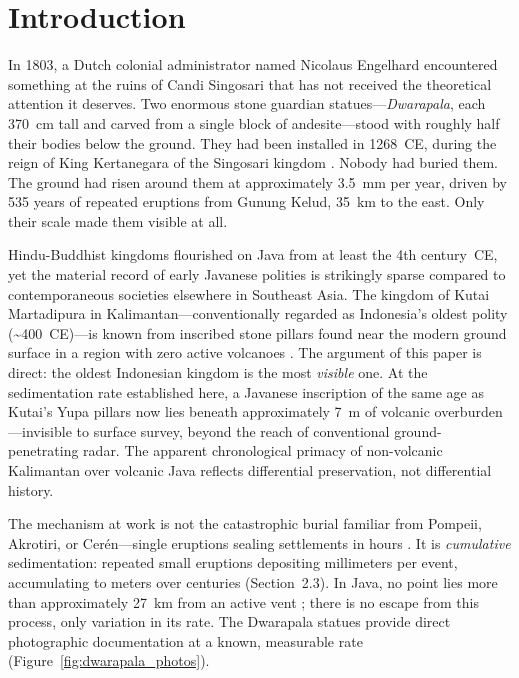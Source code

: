 \documentclass[12pt,a4paper]{article}
\begin{document}
\section{Introduction}

In 1803, a Dutch colonial administrator named Nicolaus Engelhard encountered something at the ruins of Candi Singosari that has not received the theoretical attention it deserves. Two enormous stone guardian statues---\textit{Dwarapala}, each 370~cm tall and carved from a single block of andesite---stood with roughly half their bodies below the ground. They had been installed in 1268~CE, during the reign of King Kertanegara of the Singosari kingdom \citep{kinney2003}. Nobody had buried them. The ground had risen around them at approximately 3.5~mm per year, driven by 535 years of repeated eruptions from Gunung Kelud, 35~km to the east. Only their scale made them visible at all.

Hindu-Buddhist kingdoms flourished on Java from at least the 4th century~CE, yet the material record of early Javanese polities is strikingly sparse compared to contemporaneous societies elsewhere in Southeast Asia. The kingdom of Kutai Martadipura in Kalimantan---conventionally regarded as Indonesia's oldest polity (\textasciitilde400~CE)---is known from inscribed stone pillars found near the modern ground surface in a region with zero active volcanoes \citep{vogel1918,coedes1968}. The argument of this paper is direct: the oldest Indonesian kingdom is the most \textit{visible} one. At the sedimentation rate established here, a Javanese inscription of the same age as Kutai's Yupa pillars now lies beneath approximately 7~m of volcanic overburden---invisible to surface survey, beyond the reach of conventional ground-penetrating radar. The apparent chronological primacy of non-volcanic Kalimantan over volcanic Java reflects differential preservation, not differential history.

The mechanism at work is not the catastrophic burial familiar from Pompeii, Akrotiri, or Cer\'{e}n---single eruptions sealing settlements in hours \citep{sigurdsson1985,doumas1983,sheets1992}. It is \textit{cumulative} sedimentation: repeated small eruptions depositing millimeters per event, accumulating to meters over centuries (Section~2.3). In Java, no point lies more than approximately 27~km from an active vent \citep{vanbemmelen1949}; there is no escape from this process, only variation in its rate. The Dwarapala statues provide direct photographic documentation at a known, measurable rate (Figure~\ref{fig:dwarapala_photos}).
\end{document}
